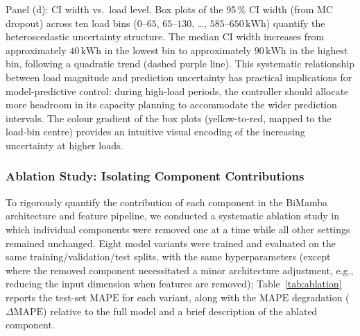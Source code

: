 \documentclass[11pt]{article}
\providecommand{\kWh}{\,\text{kWh}}
\providecommand{\MAPE}{\text{MAPE}}
\providecommand{\CI}{\text{CI}}
\begin{document}
Panel (d): $\CI$ width vs.\ load level. Box plots of the 95\,\% $\CI$ width (from MC dropout) across ten load bins ($0$–$65$, $65$–$130$, \dots, $585$–$650\kWh$) quantify the heteroscedastic uncertainty structure. The median $\CI$ width increases from approximately $40\kWh$ in the lowest bin to approximately $90\kWh$ in the highest bin, following a quadratic trend (dashed purple line). This systematic relationship between load magnitude and prediction uncertainty has practical implications for model-predictive control: during high-load periods, the controller should allocate more headroom in its capacity planning to accommodate the wider prediction intervals. The colour gradient of the box plots (yellow-to-red, mapped to the load-bin centre) provides an intuitive visual encoding of the increasing uncertainty at higher loads.

\subsubsection{Ablation Study: Isolating Component Contributions}

To rigorously quantify the contribution of each component in the BiMamba architecture and feature pipeline, we conducted a systematic ablation study in which individual components were removed one at a time while all other settings remained unchanged. Eight model variants were trained and evaluated on the same training/validation/test splits, with the same hyperparameters (except where the removed component necessitated a minor architecture adjustment, e.g., reducing the input dimension when features are removed); Table~\ref{tab:ablation} reports the test-set $\MAPE$ for each variant, along with the $\MAPE$ degradation ($\Delta\MAPE$) relative to the full model and a brief description of the ablated component.
\end{document}
